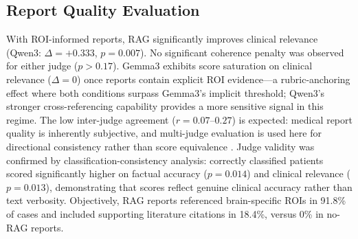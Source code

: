 \documentclass[conference]{IEEEtran}
\begin{document}
\subsection{Report Quality Evaluation}

With ROI-informed reports, RAG significantly improves clinical relevance (Qwen3: $\Delta{=}{+}0.333$, $p{=}0.007$). No significant coherence penalty was observed for either judge ($p{>}0.17$). Gemma3 exhibits score saturation on clinical relevance ($\Delta{=}0$) once reports contain explicit ROI evidence---a rubric-anchoring effect where both conditions surpass Gemma3's implicit threshold; Qwen3's stronger cross-referencing capability provides a more sensitive signal in this regime. The low inter-judge agreement ($r{=}0.07$--$0.27$) is expected: medical report quality is inherently subjective, and multi-judge evaluation is used here for directional consistency rather than score equivalence \cite{ji2023hallucination}. Judge validity was confirmed by classification-consistency analysis: correctly classified patients scored significantly higher on factual accuracy ($p{=}0.014$) and clinical relevance ($p{=}0.013$), demonstrating that scores reflect genuine clinical accuracy rather than text verbosity. Objectively, RAG reports referenced brain-specific ROIs in 91.8\% of cases and included supporting literature citations in 18.4\%, versus 0\% in no-RAG reports.
\end{document}
